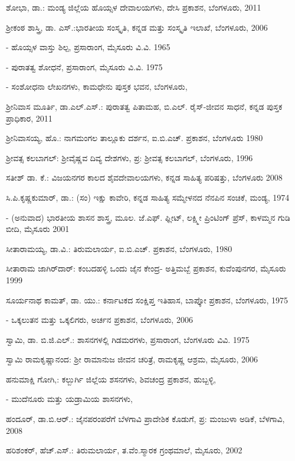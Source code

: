 \noindent
ಶೋಭಾ, ಡಾ.: ಮಂಡ್ಯ ಜಿಲ್ಲೆಯ ಹೊಯ್ಸಳ ದೇವಾಲಯಗಳು, ದೇಸಿ ಪ್ರಕಾಶನ, ಬೆಂಗಳೂರು, 2011

\noindent
ಶ‍್ರೀಕಂಠ ಶಾಸ್ತ್ರಿ, ಡಾ. ಎಸ್​.:ಭಾರತೀಯ ಸಂಸ್ಕೃತಿ, ಕನ್ನಡ ಮತ್ತು ಸಂಸ್ಕೃತಿ ಇಲಾಖೆ, ಬೆಂಗಳೂರು, 2006

- ಹೊಯ್ಸಳ ವಾಸ್ತು ಶಿಲ್ಪ, ಪ್ರಸಾರಾಂಗ, ಮೈಸೂರು ವಿ.ವಿ. 1965

- ಪುರಾತತ್ವ ಶೋಧನೆ, ಪ್ರಸಾರಾಂಗ, ಮೈಸೂರು ವಿ.ವಿ. 1975

- ಸಂಶೋಧನಾ ಲೇಖನಗಳು, ಕಾಮಧೇನು ಪುಸ್ತಕ ಭವನ, ಬೆಂಗಳೂರು,

\noindent
ಶ‍್ರೀನಿವಾಸ ಮೂರ್ತಿ, ಡಾ.ಎಲ್​.ಎಸ್​.: ಪುರಾತತ್ವ ಪಿತಾಮಹ, ಬಿ.ಎಲ್​. ರೈಸ್​-ಜೀವನ ಸಾಧನೆ, ಕನ್ನಡ ಪುಸ್ತಕ ಪ್ರಾಧಿಕಾರ, 2011

\noindent
ಶ‍್ರೀನಿವಾಸಯ್ಯ, ಹೊ.: ನಾಗಮಂಗಲ ತಾಲ್ಲೂಕು ದರ್ಶನ, ಐ.ಬಿ.ಎಚ್​. ಪ್ರಕಾಶನ, ಬೆಂಗಳೂರು 1980

\noindent
ಶ‍್ರೀವತ್ಸ ಕಲಬಾಗಲ್​: ಶ‍್ರೀವೈಷ್ಣವ ದಿವ್ಯ ದೇಶಗಳು, ಪ್ರ: ಶ‍್ರೀವತ್ಸ ಕಲಬಾಗಲ್​, ಬೆಂಗಳೂರು, 1996

\noindent
ಸತೀಶ್​ ಡಾ. ಕೆ.: ವಿಜಯನಗರ ಕಾಲದ ಶೈವದೇವಾಲಯಗಳು, ಕನ್ನಡ ಸಾಹಿತ್ಯ ಪರಿಷತ್ತು, ಬೆಂಗಳೂರು 2008

\noindent
ಸಿ.ಪಿ.ಕೃಷ್ಣಕುಮಾರ್​, ಡಾ.: (ಸಂ) ಇಕ್ಷು ಕಾವೇರಿ, ಕನ್ನಡ ಸಾಹಿತ್ಯ ಸಮ್ಮೇಳನದ ನೆನಪಿನ ಸಂಚಿಕೆ, ಮಂಡ್ಯ, 1974

- (ಅನುವಾದ) ಭಾರತೀಯ ಶಾಸನ ಶಾಸ್ತ್ರ, ಮೂಲ. ಜೆ.ಎಫ್​. ಫ್ಲೀಟ್​, ಲಕ್ಷ್ಮೀ ಪ್ರಿಂಟಿಂಗ್​ ಪ್ರೆಸ್​, ಕಾಳಮ್ಮನ ಗುಡಿ ಬೀದಿ, ಮೈಸೂರು 2001

\noindent
ಸೀತಾರಾಮಯ್ಯ, ಡಾ.ವಿ.: ತಿರುಮಲಾರ್ಯ, ಐ.ಬಿ.ಎಚ್​. ಪ್ರಕಾಶನ, ಬೆಂಗಳೂರು, 1980

\noindent
ಸೀತಾರಾಮ ಜಾಗಿರ್​ದಾರ್​: ಕಂಬದಹಳ್ಳಿ ಒಂದು ಜೈನ ಕೇಂದ್ರ- ಅತ್ತಿಮಬ್ಬೆ ಪ್ರಕಾಶನ, ಕುವೆಂಪುನಗರ, ಮೈಸೂರು 1999

\noindent
ಸೂರ್ಯನಾಥ ಕಾಮತ್​, ಡಾ. ಯು.: ಕರ್ನಾಟಕದ ಸಂಕ್ಷಿಪ್ತ ಇತಿಹಾಸ, ಬಾಪ್ಕೋ ಪ್ರಕಾಶನ, ಬೆಂಗಳೂರು, 1975

- ಒಕ್ಕಲುತನ ಮತ್ತು ಒಕ್ಕಲಿಗರು, ಅರ್ಚನ ಪ್ರಕಾಶನ, ಬೆಂಗಳೂರು, 2006

\noindent
ಸ್ವಾಮಿ, ಡಾ. ಬಿ.ಜಿ.ಎಲ್​.: ಶಾಸನಗಳಲ್ಲಿ ಗಿಡಮರಗಳು, ಪ್ರಸಾರಾಂಗ, ಬೆಂಗಳೂರು ವಿವಿ. 1975

\noindent
ಸ್ವಾಮಿ ರಾಮಕೃಷ್ಣಾನಂದ: ಶ‍್ರೀ ರಾಮಾನುಜ ಜೀವನ ಚರಿತ್ರೆ, ರಾಮಕೃಷ್ಣ ಆಶ್ರಮ, ಮೈಸೂರು, 2006

\noindent
ಹನುಮಾಕ್ಷಿ ಗೋಗಿ,: ಕಲ್ಬುರ್ಗಿ ಜಿಲ್ಲೆಯ ಶಸನಗಳು, ಶಿವಚಂದ್ರ ಪ್ರಕಾಶನ, ಹುಬ್ಬಳ್ಳಿ,

- ಮುದೆನೂರು ಮತ್ತು ಯಡ್ರಾಮಿಯ ಶಾಸನಗಳು,

\noindent
ಹಂದೂರ್​, ಡಾ.ಬಿ.ಆರ್​.: ಜೈನಪರಂಪರೆಗೆ ಬೆಳಗಾವಿ ಪ್ರಾದೇಶಿಕ ಕೊಡುಗೆ, ಪ್ರ: ಮಂಜುಳಾ ಅಡಿಕೆ, ಬೆಳಗಾವಿ, 2008

\noindent
ಹರಿಶಂಕರ್​, ಹೆಚ್​.ಎಸ್​.: ತಿರುಮಲಾರ್ಯ, ತ.ವೆಂ.ಸ್ಮಾರಕ ಗ್ರಂಥಮಾಲೆ, ಮೈಸೂರು, 2002

